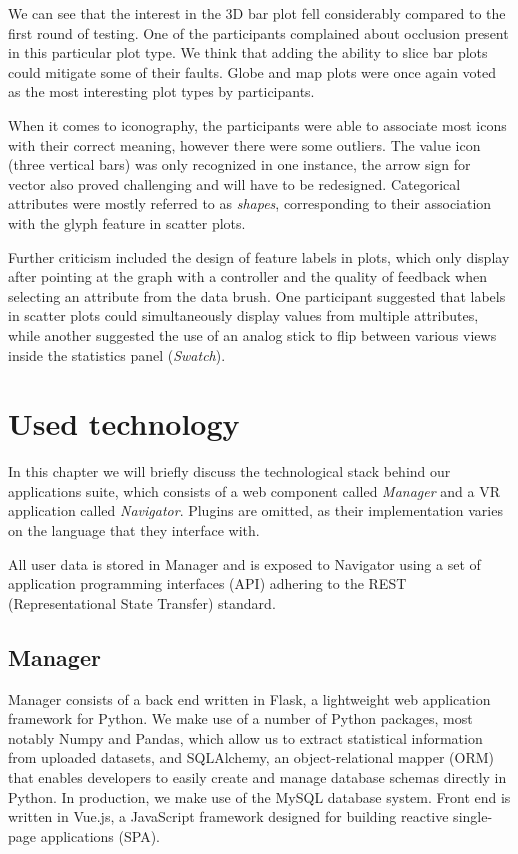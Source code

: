 \documentclass[thesis=M,english,hidelinks]{FITthesisXE}[2012/06/26]
\begin{document}
We can see that the interest in the 3D bar plot fell considerably compared to the first round of testing. One of the participants complained about occlusion present in this particular plot type. We think that adding the ability to slice bar plots could mitigate some of their faults. Globe and map plots were once again voted as the most interesting plot types by participants.

When it comes to iconography, the participants were able to associate most icons with their correct meaning, however there were some outliers. The value icon (three vertical bars) was only recognized in one instance, the arrow sign for vector also proved challenging and will have to be redesigned. Categorical attributes were mostly referred to as \emph{shapes}, corresponding to their association with the glyph feature in scatter plots.

Further criticism included the design of feature labels in plots, which only display after pointing at the graph with a controller and the quality of feedback when selecting an attribute from the data brush. One participant suggested that labels in scatter plots could simultaneously display values from multiple attributes, while another suggested the use of an analog stick to flip between various views inside the statistics panel (\emph{Swatch}).

\chapter{Used technology}

In this chapter we will briefly discuss the technological stack behind our applications suite, which consists of a web component called \emph{Manager} and a VR application called \emph{Navigator}. Plugins are omitted, as their implementation varies on the language that they interface with.

All user data is stored in Manager and is exposed to Navigator using a set of application programming interfaces (API) adhering to the REST (Representational State Transfer) standard.\autocite{fielding}

\section{Manager}

Manager consists of a back end written in Flask, a lightweight web application framework for Python.\autocite{flask} We make use of a number of Python packages, most notably Numpy\autocite{numpy} and Pandas\autocite{pandas}, which allow us to extract statistical information from uploaded datasets, and SQLAlchemy, an object-relational mapper (ORM) that enables developers to easily create and manage database schemas directly in Python.\autocite{sqlalchemy} In production, we make use of the MySQL database system.\autocite{mysql} Front end is written in Vue.js, a JavaScript framework designed for building reactive single-page applications (SPA).\autocite{vuejs}
\end{document}
